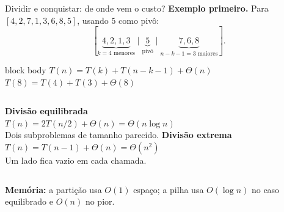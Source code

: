 \documentclass[aspectratio=169,11pt]{beamer}
\newcommand{\citep}[1]{{\color{MidGray}\tiny\cite{#1}}}
\begin{document}
\begin{frame}{Dividir e conquistar: de onde vem o custo?}
  \small
  \textbf{Exemplo primeiro.} Para \([4,2,7,1,3,6,8,5]\), usando \(5\) como pivô:
  \[
    [\underbrace{4,2,1,3}_{k=4\text{ menores}}\mid
    \underbrace{5}_{\text{pivô}}\mid
    \underbrace{7,6,8}_{n-k-1=3\text{ maiores}}].
  \]
  \vspace{-.1em}
  \begin{center}
  \end{center}
  \vspace{-.15em}
  \begin{beamercolorbox}[wd=\linewidth,sep=.5em]{block body}
    \centering
    \(\displaystyle T(n)=T(k)+T(n-k-1)+\Theta(n)\)
    \qquad
    \(\displaystyle T(8)=T(4)+T(3)+\Theta(8)\)
  \end{beamercolorbox}
  \vspace{.35em}
  \begin{columns}[T,onlytextwidth]
      \textbf{\color{MondrianBlue}Divisão equilibrada}\\[-.2em]
      \(\displaystyle T(n)=2T(n/2)+\Theta(n)=\Theta(n\log n)\)\\
      \scriptsize Dois subproblemas de tamanho parecido.
      \textbf{\color{MondrianRed}Divisão extrema}\\[-.2em]
      \(\displaystyle T(n)=T(n-1)+\Theta(n)=\Theta(n^2)\)\\
      \scriptsize Um lado fica vazio em cada chamada.
  \end{columns}
  \vspace{.3em}
  \scriptsize \textbf{Memória:} a partição usa \(O(1)\) espaço; a pilha usa \(O(\log n)\) no caso equilibrado e \(O(n)\) no pior.
  \vfill
  \citep{cormen2022,sedgwick2011}
\end{frame}
\end{document}
